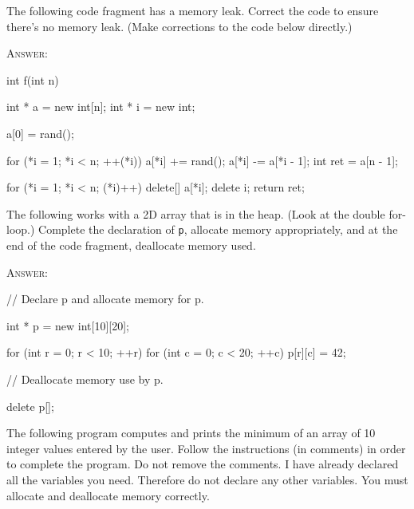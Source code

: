 \newpage
\nextq
The following code fragment has a memory leak.
Correct the code to ensure there's no memory leak.
(Make corrections to the code below directly.)

\textsc{Answer:}
\begin{answercode}
int f(int n)
{
    int * a = new int[n];
    int * i = new int;

    a[0] = rand();

    for (*i = 1; *i < n; ++(*i))
    {
        a[*i] += rand();
        a[*i] -= a[*i - 1];
    }
    int ret = a[n - 1];

    for (*i = 1; *i < n; (*i)++)
    {
      delete[] a[*i];
    }
    delete i;
    return ret;
}
\end{answercode}

\newpage
\nextq
The following works with a 2D array that is in the heap.
(Look at the double for-loop.)
Complete the declaration of \verb!p!, allocate memory appropriately,
and at the end of the code fragment, deallocate memory used.

\textsc{Answer:}
\begin{answercode}
// Declare p and allocate memory for p.

int * p = new int[10][20];
  
for (int r = 0; r < 10; ++r)
{
    for (int c = 0; c < 20; ++c)
    {
        p[r][c] = 42;
    }
}


// Deallocate memory use by p.

delete p[];

\end{answercode}


\newpage
\nextq
The following program computes and prints the minimum of an array of 10 integer
values entered by the user.
Follow the instructions (in comments) in order to complete the program.
Do not remove the comments.
I have already declared all the variables you need.
Therefore do not declare any other variables.
You must allocate and deallocate memory correctly.

